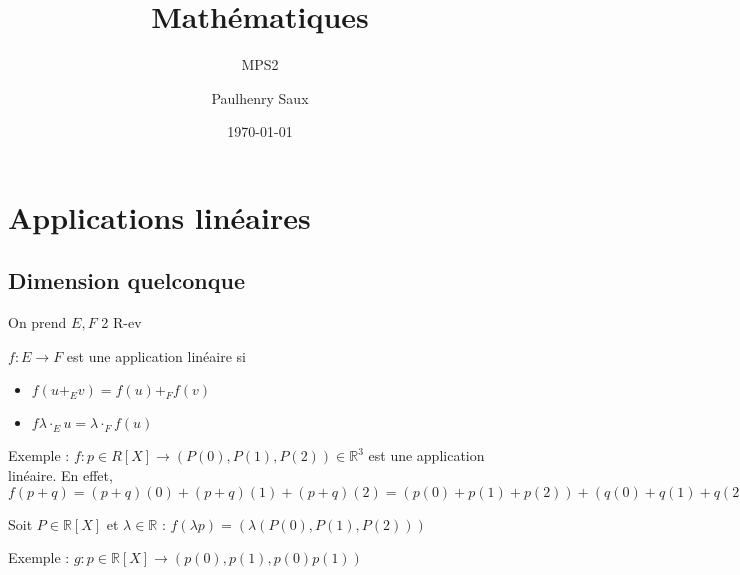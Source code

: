 \documentclass[french]{yLectureNote}
\title{Mathématiques}
\subtitle{MPS2}
\author{Paulhenry Saux}
\date{\today}
\newcommand{\R}[0]{\mathbb{R}}
\begin{document}
\setcounter{chapter}{4}
	\chapter{Applications linéaires}
\section{Dimension quelconque}
On prend $E,F$ 2 R-ev
\begin{definition}
\(f:E\to F\) est une application linéaire si
\begin{itemize}
 \item \(f(u+_Ev) = f(u)+_Ff(v)\)
 \item \(f\lambda \cdot_E u = \lambda \cdot_F f(u)\)
\end{itemize}
\end{definition}
Exemple : \(f:p\in R[X]\to (P(0),P(1),P(2))\in \R^3\) est une application linéaire. En effet, $f(p+q) = (p+q)(0)+(p+q)(1)+(p+q)(2)= (p(0)+p(1)+p(2))+(q(0)+q(1)+q(2)) = f(p)+f(q)$

Soit $P \in \R[X]$ et $\lambda \in \R$ : $f(\lambda p) = (\lambda (P(0),P(1),P(2)))$

Exemple : $g : p\in\R[X]\to (p(0),p(1),p(0)p(1))$
\end{document}
